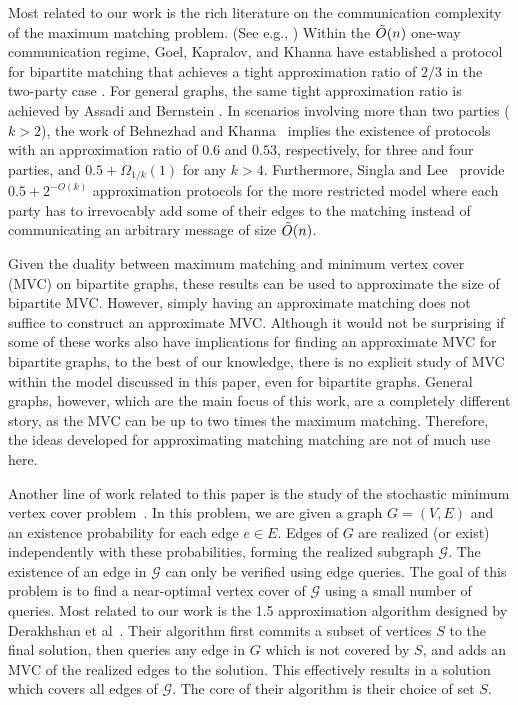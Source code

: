 \documentclass[11pt]{article}
\begin{document}
Most related to our work is the rich literature on the communication complexity of the maximum matching problem. (See e.g., \cite{DBLP:conf/soda/GoelKK12,DBLP:conf/icalp/Bernstein20,DBLP:conf/soda/AssadiB19,DBLP:journals/talg/LeeS20}) Within the $\Tilde{O}(n)$ one-way communication regime, Goel, Kapralov, and Khanna have established a protocol for bipartite matching that achieves a tight approximation ratio of $2/3$ in the two-party case \cite{DBLP:conf/soda/GoelKK12}. For general graphs, the same tight approximation ratio is achieved by Assadi and Bernstein \cite{DBLP:conf/soda/AssadiB19}. In scenarios involving more than two parties ($k>2$), the work of Behnezhad and Khanna~\cite{DBLP:conf/soda/BehnezhadK22} implies the existence of protocols with an approximation ratio of $0.6$ and $0.53$, respectively, for three and four parties, and $0.5+\Omega_{1/k}(1)$ for any $k>4$. Furthermore, Singla and Lee~\cite{DBLP:journals/talg/LeeS20} provide  $0.5+2^{-O(k)}$ approximation protocols for the more restricted model where each party has to irrevocably add some of their edges to the matching instead of communicating an arbitrary message of size $\Tilde{O}(n)$.  


Given the duality between maximum matching and minimum vertex cover (MVC) on bipartite graphs, these results can be used to approximate the size of bipartite MVC. However, simply having an approximate matching does not suffice to construct an approximate MVC. Although it would not be surprising if some of these works also have implications for finding an approximate MVC for bipartite graphs, to the best of our knowledge, there is no explicit study of MVC within the model discussed in this paper, even for bipartite graphs. General graphs, however, which are the main focus of this work, are a completely different story, as the MVC can be up to two times the maximum matching.  Therefore, the ideas developed for approximating matching matching are not of much use here. 

Another line of work related to this paper is the study of the stochastic minimum vertex cover problem~\cite{DBLP:conf/soda/BehnezhadBD22, DBLP:conf/stoc/DerakhshanDH23, DBLP:conf/innovations/Derakhshan25}.  In this problem, we are given a graph $G=(V, E)$ and an existence probability for each edge $e \in E$. Edges of $G$ are realized (or exist) independently with these probabilities, forming the realized subgraph $\mathcal{G}$. The existence of an edge in $\mathcal{G}$ can only be verified using edge queries. The goal of this problem is to find a near-optimal vertex cover of $\mathcal{G}$ using a small number of queries.  Most related to our work is the 1.5 approximation algorithm designed by Derakhshan et al~\cite{DBLP:conf/stoc/DerakhshanDH23}. Their algorithm first commits a subset of vertices $S$ to the final solution, then queries any edge in $G$ which is not covered by $S$, and adds an MVC of the realized edges to the solution. This effectively results in a solution which covers all edges of $\mathcal{G}$. The core of their algorithm is their choice of set $S$.
\end{document}
